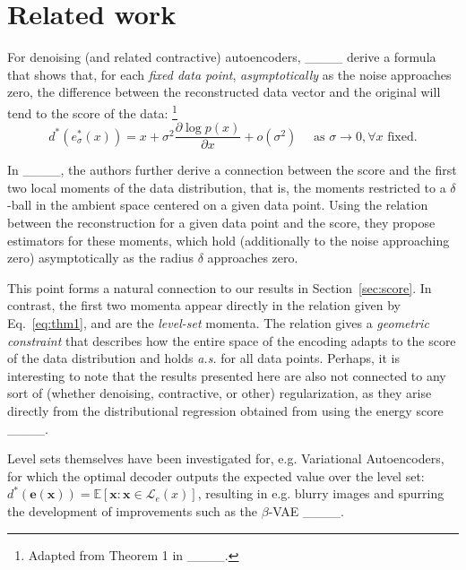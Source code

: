 \section{Related work}
%
\label{sec:related_work}

For denoising (and related contractive) autoencoders, ____ derive a formula that shows that, for each \textit{fixed data point}, \textit{asymptotically} as the noise approaches zero, the difference between the reconstructed data vector and the original will tend to the score of the data:
\footnote{Adapted from Theorem 1 in ____.}
\begin{equation}
    d^*(e_\sigma^*(x)) = x+\sigma^2 \frac{\partial \log p(x)}{\partial x}+o\left(\sigma^2\right) \quad \text{ as } \sigma \rightarrow 0, \forall x \text{ fixed}.
    \label{eq:bengio_matching}
\end{equation}

In ____, the authors further derive a connection between the score and the first two local moments of the data distribution, that is, the moments restricted to a $\delta$-ball in the ambient space centered on a given data point. Using the relation between the reconstruction for a given data point and the score, they propose estimators for these moments, which hold (additionally to the noise approaching zero) asymptotically as the radius $\delta$ approaches zero.


This point forms a natural connection to our results in Section~\ref{sec:score}. In contrast, the first two momenta appear directly in the relation given by Eq.~\ref{eq:thm1}, and are the \textit{level-set} momenta. The relation gives a \textit{geometric constraint} that describes how the entire space of the encoding adapts to the score of the data distribution and holds \textit{a.s.} for all data points. Perhaps, it is interesting to note that the results presented here are also not connected to any sort of (whether denoising, contractive, or other) regularization, as they arise directly from the distributional regression obtained from using the energy score ____.


Level sets themselves have been investigated for, e.g. Variational Autoencoders, for which the optimal decoder outputs the expected value over the level set: $d^*(\boldsymbol{e(x)})=\mathbb{E}[\boldsymbol{x}: \boldsymbol{x} \in \mathcal{L}_e(x)]$, resulting in e.g. blurry images and spurring the development of improvements such as the $\beta$-VAE ____.




